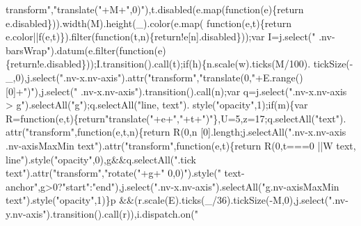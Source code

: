 \begin{DoxyCode}
{{      transform"},\textcolor{stringliteral}{"translate("}+M+\textcolor{stringliteral}{",0)"}),t.disabled(e.map(\textcolor{keyword}{function}(e)\{return e.disabled\})).width(M).height(\_).color(e.map(\textcolor{keyword}{
      function}(e,t)\{return e.color||f(e,t)\}).filter(\textcolor{keyword}{function}(t,n)\{\textcolor{keywordflow}{return}!e[n].disabled\}));var I=j.select(\textcolor{stringliteral}{"
      .nv-barsWrap"}).datum(e.filter(\textcolor{keyword}{function}(e)\{return!e.disabled\}));I.transition().call(t);\textcolor{keywordflow}{if}(h)\{n.scale(w).ticks(M/100).
      tickSize(-\_,0),j.select(\textcolor{stringliteral}{".nv-x.nv-axis"}).attr(\textcolor{stringliteral}{"transform"},\textcolor{stringliteral}{"translate(0,"}+E.range()[0]+\textcolor{stringliteral}{")"}),j.select(\textcolor{stringliteral}{"
      .nv-x.nv-axis"}).transition().call(n);var q=j.select(\textcolor{stringliteral}{".nv-x.nv-axis > g"}).selectAll(\textcolor{stringliteral}{"g"});q.selectAll(\textcolor{stringliteral}{"line, text"}).
      style(\textcolor{stringliteral}{"opacity"},1);\textcolor{keywordflow}{if}(m)\{var R=\textcolor{keyword}{function}(e,t)\{\textcolor{keywordflow}{return}\textcolor{stringliteral}{"translate("}+e+\textcolor{stringliteral}{","}+t+\textcolor{stringliteral}{")"}\},U=5,z=17;q.selectAll(\textcolor{stringliteral}{"text"}).
      attr(\textcolor{stringliteral}{"transform"},\textcolor{keyword}{function}(e,t,n)\{\textcolor{keywordflow}{return} R(0,n%
      [0].length;j.selectAll(\textcolor{stringliteral}{".nv-x.nv-axis .nv-axisMaxMin text"}).attr(\textcolor{stringliteral}{"transform"},\textcolor{keyword}{function}(e,t)\{\textcolor{keywordflow}{return} R(0,t===0
      ||W%
      text, line"}).style(\textcolor{stringliteral}{"opacity"},0),g&&q.selectAll(\textcolor{stringliteral}{".tick text"}).attr(\textcolor{stringliteral}{"transform"},\textcolor{stringliteral}{"rotate("}+g+\textcolor{stringliteral}{" 0,0)"}).style(\textcolor{stringliteral}{"
      text-anchor"},g>0?\textcolor{stringliteral}{"start"}:\textcolor{stringliteral}{"end"}),j.select(\textcolor{stringliteral}{".nv-x.nv-axis"}).selectAll(\textcolor{stringliteral}{"g.nv-axisMaxMin text"}).style(\textcolor{stringliteral}{"opacity"},1)\}p
      &&(r.scale(E).ticks(\_/36).tickSize(-M,0),j.select(\textcolor{stringliteral}{".nv-y.nv-axis"}).transition().call(r)),i.dispatch.on(\textcolor{stringliteral}{"
}
\end{DoxyCode}
